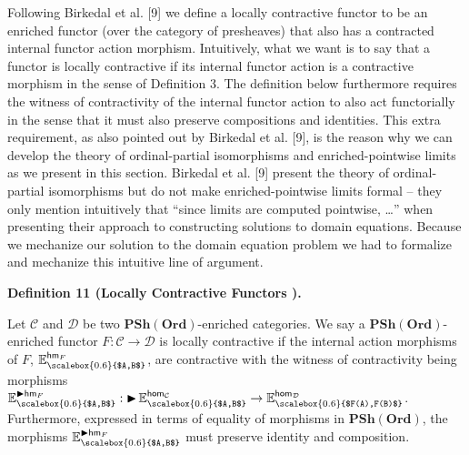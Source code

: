 \documentclass[10pt,a4paper]{article}
\begin{document}
 
 
 
Following Birkedal et al. [9] we define a locally contractive functor to be an enriched functor (over the category of presheaves) that also has a contracted internal functor action morphism. Intuitively, what we want is to say that a functor is locally contractive if its internal functor action is a contractive morphism in the sense of Definition 3. The definition below furthermore requires the witness of contractivity of the internal functor action to also act functorially in the sense that it must also preserve compositions and identities. This extra requirement, as also pointed out by Birkedal et al. [9], is the reason why we can develop the theory of ordinal-partial isomorphisms and enriched-pointwise limits as we present in this section. Birkedal et al. [9] present the theory of ordinal-partial isomorphisms but do not make enriched-pointwise limits formal – they only mention intuitively that “since limits are computed pointwise, …” when presenting their approach to constructing solutions to domain equations. Because we mechanize our solution to the domain equation problem we had to formalize and mechanize this intuitive line of argument.\par
 
 
 
\par\medskip\noindent\textbf{Definition 11 (Locally Contractive Functors ).}\par
 
 
Let $\mathcal{C}$ and $\mathcal{D}$ be two $\mathbf{PSh}(\mathbf{Ord})$-enriched categories. We say a $\mathbf{PSh}(\mathbf{Ord})$-enriched functor $F:\mathcal{C}\to\mathcal{D}$ is locally contractive if the internal action morphisms of $F$, $\mathbb{E}^{\mathsf{hm}_{F}}_{\scalebox{0.6}{$A,B$}}$, are contractive with the witness of contractivity being morphisms $\mathbb{E}^{\mathop{\blacktriangleright}{}\!\mathsf{hm}_{F}}_{\scalebox{0.6}{$A,B$}}:\mathop{\blacktriangleright}\mathbb{E}^{\mathsf{hom}_{\mathcal{C}}}_{\scalebox{0.6}{$A,B$}}\to\mathbb{E}^{\mathsf{hom}_{\mathcal{D}}}_{\scalebox{0.6}{$F(A),F(B)$}}$. Furthermore, expressed in terms of equality of morphisms in $\mathbf{PSh}(\mathbf{Ord})$, the morphisms $\mathbb{E}^{\mathop{\blacktriangleright}{}\!\mathsf{hm}_{F}}_{\scalebox{0.6}{$A,B$}}$ must preserve identity and composition.\par
 
\end{document}
